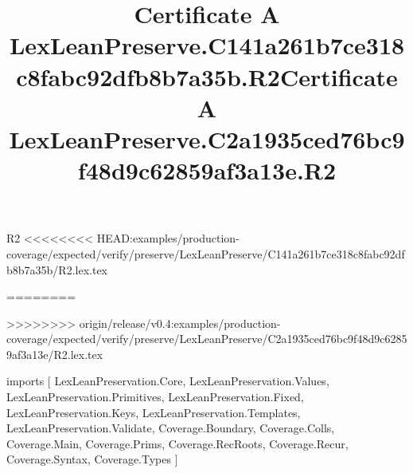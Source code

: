 \begin{lexlean}{R2}
<<<<<<<< HEAD:examples/production-coverage/expected/verify/preserve/LexLeanPreserve/C141a261b7ce318c8fabc92dfb8b7a35b/R2.lex.tex
\title{Certificate A LexLeanPreserve.C141a261b7ce318c8fabc92dfb8b7a35b.R2}
========
\title{Certificate A LexLeanPreserve.C2a1935ced76bc9f48d9c62859af3a13e.R2}
>>>>>>>> origin/release/v0.4:examples/production-coverage/expected/verify/preserve/LexLeanPreserve/C2a1935ced76bc9f48d9c62859af3a13e/R2.lex.tex
\begin{coremodule}
imports [
  LexLeanPreservation.Core,
  LexLeanPreservation.Values,
  LexLeanPreservation.Primitives,
  LexLeanPreservation.Fixed,
  LexLeanPreservation.Keys,
  LexLeanPreservation.Templates,
  LexLeanPreservation.Validate,
  Coverage.Boundary,
  Coverage.Colls,
  Coverage.Main,
  Coverage.Prims,
  Coverage.RecRoots,
  Coverage.Recur,
  Coverage.Syntax,
  Coverage.Types
]


\end{coremodule}
\end{lexlean}
